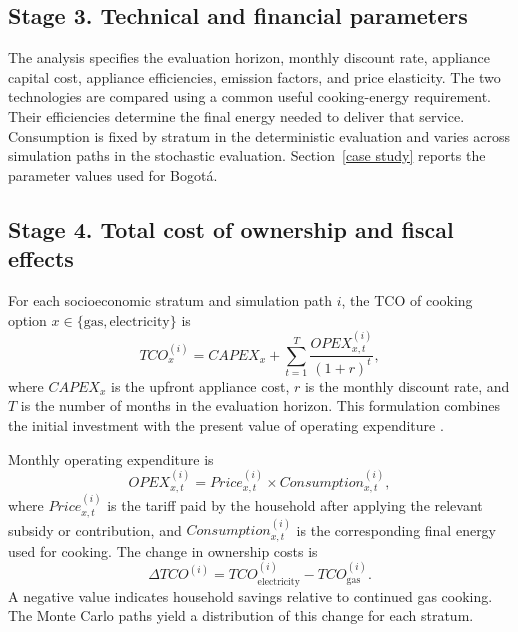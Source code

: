 \documentclass[authoryear,preprint,review,10pt]{elsarticle}
\begin{document}
\subsection{Stage 3. Technical and financial parameters}
\label{sec:parameter_selection}

The analysis specifies the evaluation horizon, monthly discount rate, appliance capital cost, appliance efficiencies, emission factors, and price elasticity. The two technologies are compared using a common useful cooking-energy requirement. Their efficiencies determine the final energy needed to deliver that service. Consumption is fixed by stratum in the deterministic evaluation and varies across simulation paths in the stochastic evaluation. Section~\ref{case study} reports the parameter values used for Bogotá.

\subsection{Stage 4. Total cost of ownership and fiscal effects}
\label{sec:cost_calculation}

For each socioeconomic stratum and simulation path $i$, the TCO of cooking option $x \in \{\text{gas},\text{electricity}\}$ is
\begin{equation}
TCO_x^{(i)} =
CAPEX_x + \sum_{t=1}^{T}
\frac{OPEX_{x,t}^{(i)}}{(1+r)^t},
\end{equation}
where $CAPEX_x$ is the upfront appliance cost, $r$ is the monthly discount rate, and $T$ is the number of months in the evaluation horizon. This formulation combines the initial investment with the present value of operating expenditure \citep{ellram1994taxonomy,bauer2025total,ElectricVehicleTCO}.

Monthly operating expenditure is
\begin{equation}
OPEX_{x,t}^{(i)} =
Price_{x,t}^{(i)} \times Consumption_{x,t}^{(i)},
\end{equation}
where $Price_{x,t}^{(i)}$ is the tariff paid by the household after applying the relevant subsidy or contribution, and $Consumption_{x,t}^{(i)}$ is the corresponding final energy used for cooking. The change in ownership costs is
\begin{equation}
\Delta TCO^{(i)} =
TCO_{\text{electricity}}^{(i)} - TCO_{\text{gas}}^{(i)}.
\end{equation}
A negative value indicates household savings relative to continued gas cooking. The Monte Carlo paths yield a distribution of this change for each stratum.
\end{document}
